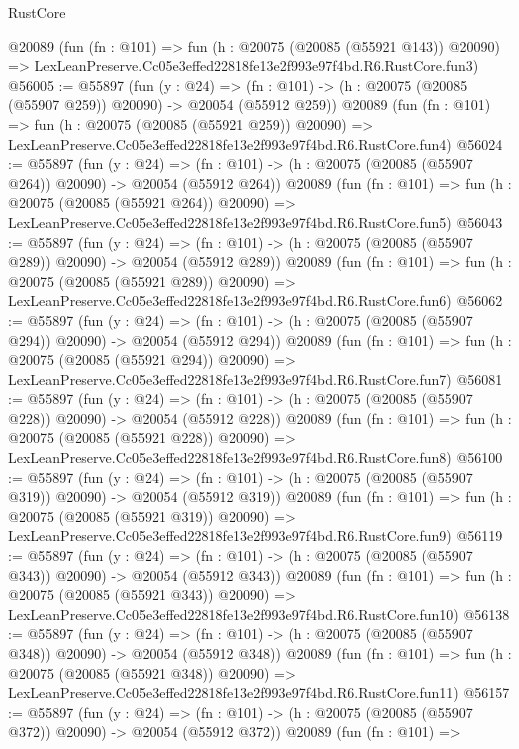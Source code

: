\begin{lexlean}{RustCore}
\begin{coremodule}
    @20089
    (fun (fn : @101) =>
    fun (h : @20075 (@20085 (@55921 @143)) @20090) =>
    LexLeanPreserve.Cc05e3effed22818fe13e2f993e97f4bd.R6.RustCore.fun3)
@56005 := @55897
    (fun (y : @24) =>
    (fn : @101) -> (h : @20075 (@20085 (@55907 @259)) @20090) -> @20054 (@55912 @259))
    @20089
    (fun (fn : @101) =>
    fun (h : @20075 (@20085 (@55921 @259)) @20090) =>
    LexLeanPreserve.Cc05e3effed22818fe13e2f993e97f4bd.R6.RustCore.fun4)
@56024 := @55897
    (fun (y : @24) =>
    (fn : @101) -> (h : @20075 (@20085 (@55907 @264)) @20090) -> @20054 (@55912 @264))
    @20089
    (fun (fn : @101) =>
    fun (h : @20075 (@20085 (@55921 @264)) @20090) =>
    LexLeanPreserve.Cc05e3effed22818fe13e2f993e97f4bd.R6.RustCore.fun5)
@56043 := @55897
    (fun (y : @24) =>
    (fn : @101) -> (h : @20075 (@20085 (@55907 @289)) @20090) -> @20054 (@55912 @289))
    @20089
    (fun (fn : @101) =>
    fun (h : @20075 (@20085 (@55921 @289)) @20090) =>
    LexLeanPreserve.Cc05e3effed22818fe13e2f993e97f4bd.R6.RustCore.fun6)
@56062 := @55897
    (fun (y : @24) =>
    (fn : @101) -> (h : @20075 (@20085 (@55907 @294)) @20090) -> @20054 (@55912 @294))
    @20089
    (fun (fn : @101) =>
    fun (h : @20075 (@20085 (@55921 @294)) @20090) =>
    LexLeanPreserve.Cc05e3effed22818fe13e2f993e97f4bd.R6.RustCore.fun7)
@56081 := @55897
    (fun (y : @24) =>
    (fn : @101) -> (h : @20075 (@20085 (@55907 @228)) @20090) -> @20054 (@55912 @228))
    @20089
    (fun (fn : @101) =>
    fun (h : @20075 (@20085 (@55921 @228)) @20090) =>
    LexLeanPreserve.Cc05e3effed22818fe13e2f993e97f4bd.R6.RustCore.fun8)
@56100 := @55897
    (fun (y : @24) =>
    (fn : @101) -> (h : @20075 (@20085 (@55907 @319)) @20090) -> @20054 (@55912 @319))
    @20089
    (fun (fn : @101) =>
    fun (h : @20075 (@20085 (@55921 @319)) @20090) =>
    LexLeanPreserve.Cc05e3effed22818fe13e2f993e97f4bd.R6.RustCore.fun9)
@56119 := @55897
    (fun (y : @24) =>
    (fn : @101) -> (h : @20075 (@20085 (@55907 @343)) @20090) -> @20054 (@55912 @343))
    @20089
    (fun (fn : @101) =>
    fun (h : @20075 (@20085 (@55921 @343)) @20090) =>
    LexLeanPreserve.Cc05e3effed22818fe13e2f993e97f4bd.R6.RustCore.fun10)
@56138 := @55897
    (fun (y : @24) =>
    (fn : @101) -> (h : @20075 (@20085 (@55907 @348)) @20090) -> @20054 (@55912 @348))
    @20089
    (fun (fn : @101) =>
    fun (h : @20075 (@20085 (@55921 @348)) @20090) =>
    LexLeanPreserve.Cc05e3effed22818fe13e2f993e97f4bd.R6.RustCore.fun11)
@56157 := @55897
    (fun (y : @24) =>
    (fn : @101) -> (h : @20075 (@20085 (@55907 @372)) @20090) -> @20054 (@55912 @372))
    @20089
    (fun (fn : @101) =>

\end{coremodule}
\end{lexlean}
